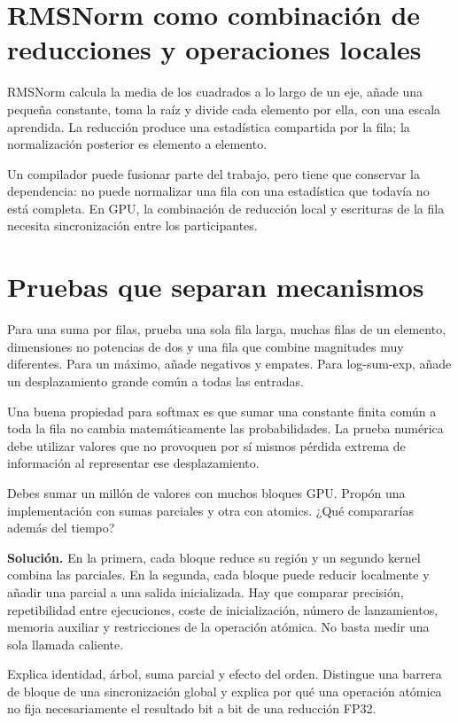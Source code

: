 \documentclass[12pt,a4paper,oneside]{report}
\begin{document}
\section{RMSNorm como combinación de reducciones y operaciones locales}
RMSNorm calcula la media de los cuadrados a lo largo de un eje, añade una pequeña constante, toma la raíz y divide cada elemento por ella, con una escala aprendida. La reducción produce una estadística compartida por la fila; la normalización posterior es elemento a elemento.

Un compilador puede fusionar parte del trabajo, pero tiene que conservar la dependencia: no puede normalizar una fila con una estadística que todavía no está completa. En GPU, la combinación de reducción local y escrituras de la fila necesita sincronización entre los participantes.

\section{Pruebas que separan mecanismos}
Para una suma por filas, prueba una sola fila larga, muchas filas de un elemento, dimensiones no potencias de dos y una fila que combine magnitudes muy diferentes. Para un máximo, añade negativos y empates. Para log-sum-exp, añade un desplazamiento grande común a todas las entradas.

Una buena propiedad para softmax es que sumar una constante finita común a toda la fila no cambia matemáticamente las probabilidades. La prueba numérica debe utilizar valores que no provoquen por sí mismos pérdida extrema de información al representar ese desplazamiento.

\begin{practica}
Debes sumar un millón de valores con muchos bloques GPU. Propón una implementación con sumas parciales y otra con atomics. ¿Qué compararías además del tiempo?

\end{practica}
\textbf{Solución.} En la primera, cada bloque reduce su región y un segundo kernel combina las parciales. En la segunda, cada bloque puede reducir localmente y añadir una parcial a una salida inicializada. Hay que comparar precisión, repetibilidad entre ejecuciones, coste de inicialización, número de lanzamientos, memoria auxiliar y restricciones de la operación atómica. No basta medir una sola llamada caliente.

\begin{comprueba}
Explica identidad, árbol, suma parcial y efecto del orden. Distingue una barrera de bloque de una sincronización global y explica por qué una operación atómica no fija necesariamente el resultado bit a bit de una reducción FP32.

\end{comprueba}
\end{document}

